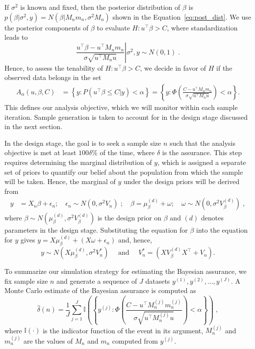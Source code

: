 If $\sigma^2$ is known and fixed, then the posterior distribution of 
$\beta$ is $\displaystyle p(\beta | \sigma^2, y) = N(\beta | 
M_nm_n, \sigma^2M_n)$ shown
in the Equation~\eqref{eq:post_dist}. 
We use the posterior components
of $\beta$ to evaluate $H: u^{\top}\beta > C$,
where standardization leads to
\begin{equation} \label{eq1}                                                                    
\left.\frac{u^{\top}\beta - u^{\top}M_nm_n}{\sigma \sqrt{u^{\top}M_nu}} \right| \sigma^2, y \sim N(0,1)\;.
\end{equation}
Hence, to assess the tenability of $H: u^{\top}\beta > C$, we decide 
in favor of $H$ if the observed data belongs in the set
\begin{align*}
    A_{\alpha}(u, \beta, C) &= \left\{y: P\left(u^{\top}\beta
    \leq C | y\right)  < \alpha\right\} = \left\{y: \Phi
    \left(\frac{C - u^{\top}M_n m_n}{\sigma \sqrt{u^{\top}M_nu}}\right)
    < \alpha \right\}.
\end{align*}
This defines our analysis objective, which we 
will monitor within each sample iteration. 
Sample generation is taken to account for in the design stage 
discussed in the next section. 

In the design stage, the goal is to seek a 
sample size $n$ such that the
analysis objective is met at least $100\delta \%$ of the time,
where $\delta$ is the assurance.
This step requires determining the marginal 
distribution of $y$, which is assigned a separate set 
of priors to quantify our belief about the population 
from which the sample will be taken. Hence, the marginal 
of $y$ under the design priors will be derived from 
\begin{align}\label{eq: ohagan_stevens_linear_regression_design_priors}
  y &=  X_n\beta + \epsilon_n; \quad \epsilon_n \sim N(0, \sigma^2 V_n)\;;\quad \beta = \mu_{\beta}^{(d)} + \omega; \quad \omega \sim N(0, \sigma^2 V_{\beta}^{(d)})\;,
\end{align}
where $\beta\sim N(\mu_{\beta}^{(d)},\sigma^2 V_{\beta}^{(d)})$ is the design prior on $\beta$ and $(d)$ denotes parameters
in the design stage. Substituting the equation for $\beta$ into the equation for $y$ 
gives $y = X\mu_{\beta}^{(d)} + (X\omega + \epsilon_n)$ and, hence, 
\[
y \sim N\left(X\mu_{\beta}^{(d)}, \sigma^2V_n^{*}\right) \quad \mbox{ and }\quad 
V_n^{\ast} = \left(XV_{\beta}^{(d)}X^{\top} + V_n\right).
\] 

To summarize our simulation strategy for estimating
the Bayesian assurance, we fix sample size $n$ and generate
a sequence of $J$ datasets $y^{(1)}, y^{(2)}, ..., y^{(J)}$.
A Monte Carlo estimate of the Bayesian assurance is
computed as 
\[
\hat{\delta}(n) = \frac{1}{J}\sum_{j=1}^J \mathbb{I}\left(\left\{y^{(j)}:
    \Phi \left(\frac{C - u^{\top}M_n^{(j)}m_n^{(j)}}{\sigma
    \sqrt{u^{\top}M_n^{(j)}u}}\right) < \alpha \right\}\right)\;,
\]
where $\mathbb{I}(\cdot)$ is the indicator function of the
event in its argument, $M_n^{(j)}$ and $m_n^{(j)}$ are the
values of $M_n$ and $m_n$ computed from $y^{(j)}$.




